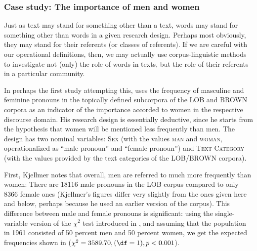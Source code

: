 \subsubsection{Case study: The importance of men and women}
\label{sec:theimportanceofmenandwomen}

Just as text may stand for something other than a text, words may stand for something other than words in a given research design.  Perhaps most obviously, they may stand for their referents (or classes of referents). If we are careful with our operational  definitions, then, we may actually use corpus\hyp{}linguistic methods to investigate not (only) the role of words in texts, but the role of their referents in a particular community.

In perhaps the first study attempting this, \citet{kjellmer_lesser_1986} uses the frequency  of masculine and feminine pronouns  in the topically defined subcorpora of the LOB  and BROWN  corpora as an indicator of the importance accorded to women in the respective discourse domain.  His research design  is essentially deductive,  since he starts from the hypothesis that women will be mentioned less frequently than men. The design has two nominal  variables: \textsc{Sex} (with the values \textsc{man} and \textsc{woman}, operationalized  as ``male pronoun'' and ``female pronoun'') and \textsc{Text Category} (with the values provided by the text categories of the LOB\slash BROWN  corpora).

First, Kjellmer notes that overall, men are referred to much more frequently than women: There are \num{18116} male pronouns in the LOB  corpus compared to only \num{8366} female ones (Kjellmer's figures differ very slightly from the ones given here and below, perhaps because he used an earlier version of the corpus). This difference between male and female pronouns  is significant: using the single\hyp{}variable version of the $\chi^2$  test introduced in , and assuming that the population in 1961 consisted of 50 percent men and 50 percent women,  we get the expected  frequencies shown in  ($\chi^2 = 3589.70, (\df = 1), p < 0.001$).


